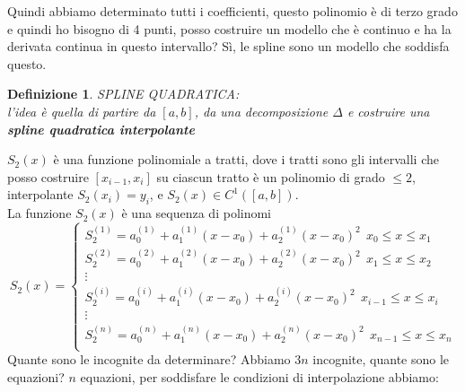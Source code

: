 \documentclass[a4paper, portrait]{book}
\numberwithin{equation}{chapter} %
\newtheorem{definition}{Definizione}
\begin{document}
Quindi abbiamo determinato tutti i coefficienti, questo polinomio è di terzo grado e quindi ho bisogno di 4 punti, posso costruire un modello che è continuo e ha la derivata continua in questo intervallo? Sì, le spline sono un modello che soddisfa questo.
\begin{definition}
    SPLINE QUADRATICA:\\
    l'idea è quella di partire da $[a,b]$, da una decomposizione $\Delta$ e costruire una \textbf{spline quadratica interpolante}
\end{definition}
$S_2(x)$ è una funzione polinomiale a tratti, dove i tratti sono gli intervalli che posso costruire $[x_{i-1},x_i]$ su ciascun tratto è un polinomio di grado $\leq 2$, interpolante $S_2(x_i) = y_i$, e $S_2(x) \in C^1([a,b])$.\\
La funzione $S_2(x)$ è una sequenza di polinomi
\begin{equation}
    S_2(x) = \begin{cases}
        S_2^{(1)} = a_0^{(1)} + a_1^{(1)}(x-x_0)+a_2^{(1)}(x-x_0)^2 \ \ x_0 \leq x \leq x_1\\
        S_2^{(2)} = a_0^{(2)} + a_1^{(2)}(x-x_0)+a_2^{(2)}(x-x_0)^2 \ \ x_1 \leq x \leq x_2\\
        \vdots\\
        S_2^{(i)} = a_0^{(i)} + a_1^{(i)}(x-x_0)+a_2^{(i)}(x-x_0)^2 \ \ x_{i-1} \leq x \leq x_i\\
        \vdots\\
        S_2^{(n)} = a_0^{(n)} + a_1^{(n)}(x-x_0)+a_2^{(n)}(x-x_0)^2 \ \ x_{n-1} \leq x \leq x_n\\
    \end{cases}
\end{equation}
Quante sono le incognite da determinare? Abbiamo $3n$ incognite, quante sono le equazioni? $n$ equazioni, per soddisfare le condizioni di interpolazione abbiamo:
\end{document}

